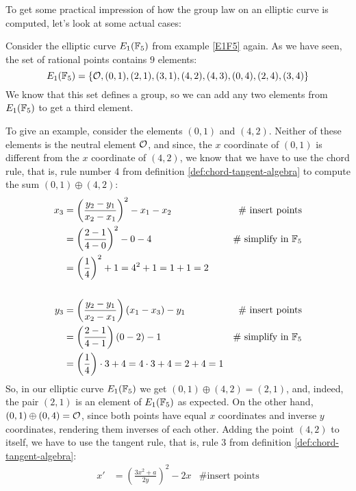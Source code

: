 To get some practical impression of how the group law on an elliptic curve is computed, let's look at some actual cases: 
\begin{example}\label{ex:01+42}
Consider the elliptic curve $E_1(\mathbb{F}_5)$ from example \ref{E1F5} again.  As we have seen, the set of rational points contains $9$ elements:
$$
E_1(\mathbb{F}_5) = \{\mathcal{O}, (0,1),(2,1),(3,1),(4,2),(4,3),(0,4),(2,4),(3,4)\}
$$
We know that this set defines a group, so we can add any two elements from $E_1(\mathbb{F}_5)$ to get a third element. 

To give an example, consider the elements $(0,1)$ and $(4,2)$. Neither of these elements is the neutral element $\mathcal{O}$, and since, the $x$ coordinate of $(0,1)$ is different from the $x$ coordinate of $(4,2)$, we know that we have to use the chord rule, that is, rule number 4 from definition \ref{def:chord-tangent-algebra} to compute the sum $(0,1)\oplus (4,2)$:
\begin{align*}
x_3  & = \left(\frac{y_2-y_1}{x_2-x_1}\right)^2 -x_1-x_2 & \text{\# insert points}\\
     & = \left(\frac{2-1}{4-0}\right)^2 -0-4  & \text{\# simplify in } \mathbb{F}_5\\
     & = \left(\frac{1}{4}\right)^2 +1
       = 4^2 +1
       = 1 +1 
       = 2
\\
\\
y_3  & = \left(\frac{y_2-y_1}{x_2-x_1} \right)\left(x_1-x_3\right) - y_1  & \text{\# insert points}\\     
     & = \left(\frac{2-1}{4-1} \right)\left(0-2\right) - 1   & \text{\# simplify in } \mathbb{F}_5\\    
     & = \left(\frac{1}{4} \right)\cdot 3 + 4   
       = 4\cdot 3 + 4
       = 2 + 4
       = 1          
\end{align*} 
So, in our elliptic curve $E_1(\mathbb{F}_5)$ we get $(0,1)\oplus (4,2) =(2,1)$, and, indeed, the pair $(2,1)$ is an element of $E_1(\mathbb{F}_5)$ as expected. On the other hand, $(0,1)\oplus (0,4) =\mathcal{O}$, since both points have equal $x$ coordinates and inverse $y$ coordinates, rendering them inverses of each other. Adding the point $(4,2)$ to itself, we have to use the tangent rule, that is, rule 3 from definition \ref{def:chord-tangent-algebra}:
\begin{align*}
x'  & = \left(\frac{3x^2+a}{2y}\right)^2 -2x   & \text{\# insert points}\\

\end{align*}
\end{example}
